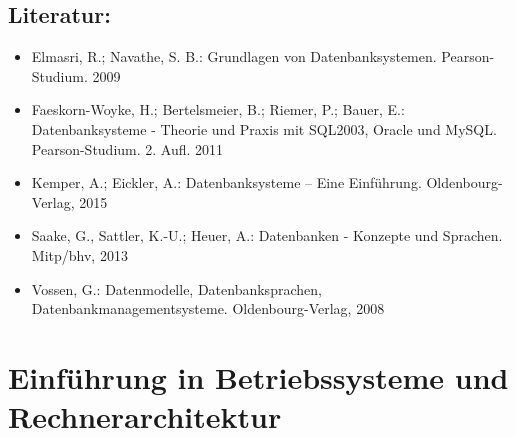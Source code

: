 \section*{Literatur:}\label{literatur-5}

\begin{itemize}
\item
  Elmasri, R.; Navathe, S. B.: Grundlagen von Datenbanksystemen.
  Pearson-Studium. 2009
\item
  Faeskorn-Woyke, H.; Bertelsmeier, B.; Riemer, P.; Bauer, E.:
  Datenbanksysteme - Theorie und Praxis mit SQL2003, Oracle und MySQL.
  Pearson-Studium. 2. Aufl. 2011
\item
  Kemper, A.; Eickler, A.: Datenbanksysteme -- Eine Einführung.
  Oldenbourg-Verlag, 2015
\item
  Saake, G., Sattler, K.-U.; Heuer, A.: Datenbanken - Konzepte und
  Sprachen. Mitp/bhv, 2013
\item
  Vossen, G.: Datenmodelle, Datenbanksprachen,
  Datenbankmanagementsysteme. Oldenbourg-Verlag, 2008
\end{itemize}

\chapter{Einführung in Betriebssysteme und
Rechnerarchitektur}\label{einfuxfchrung-in-betriebssysteme-und-rechnerarchitektur}

